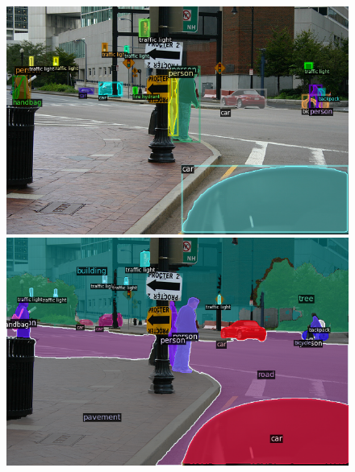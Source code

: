 

\begin{figure}[h!]
    \footnotesize
    \centering
    
    
    \begin{minipage}[b]{.45\linewidth}
    \includegraphics[width=\linewidth]{vis/success/val_111_det.png}
    \end{minipage}
    \begin{minipage}[b]{.45\linewidth}
    \includegraphics[width=\linewidth]{vis/success/val_111_pan.png}
    \end{minipage}
    

\end{figure}
